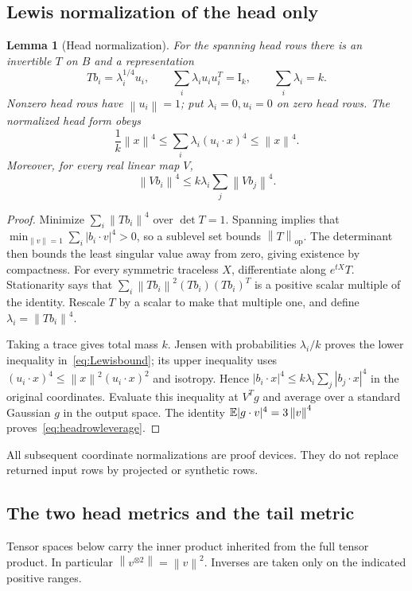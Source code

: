 \documentclass[11pt]{article}
\newtheorem{lemma}[theorem]{Lemma}
\theoremstyle{remark}\newtheorem{remark}[theorem]{Remark}
\newcommand{\op}{\mathrm{op}}\newcommand{\Frob}{\mathrm F}
\newcommand{\norm}[1]{\left\lVert#1\right\rVert}\newcommand{\abs}[1]{\left|#1\right|}
\newcommand{\Id}{\mathrm I}\newcommand{\dbar}{\bar d}
\numberwithin{equation}{section}
\begin{document}
\subsection{Lewis normalization of the head only}
\begin{lemma}[Head normalization]\label{lem:lewis}
For the spanning head rows there is an invertible $T$ on $B$ and a representation
\[
 Tb_i=\lambda_i^{1/4}u_i,\qquad
 \sum_i\lambda_i u_i u_i^T=\Id_k,\qquad
 \sum_i\lambda_i=k.
\]
Nonzero head rows have $\norm{u_i}=1$; put $\lambda_i=0,u_i=0$ on zero head rows. The normalized head form obeys
\begin{equation}\label{eq:Lewisbound}
 \frac1k\norm x^4\le \sum_i\lambda_i(u_i\cdot x)^4\le\norm x^4.
\end{equation}
Moreover, for every real linear map $V$,
\begin{equation}\label{eq:headrowleverage}
 \norm{Vb_i}^4\le k\lambda_i\sum_j\norm{Vb_j}^4.
\end{equation}
\end{lemma}
\begin{proof}
Minimize $\sum_i\norm{Tb_i}^4$ over $\det T=1$. Spanning implies that $\min_{\norm v=1}\sum_i|b_i\cdot v|^4>0$, so a sublevel set bounds $\norm T_\op$. The determinant then bounds the least singular value away from zero, giving existence by compactness. For every symmetric traceless $X$, differentiate along $e^{tX}T$. Stationarity says that $\sum_i\norm{Tb_i}^2(Tb_i)(Tb_i)^T$ is a positive scalar multiple of the identity. Rescale $T$ by a scalar to make that multiple one, and define $\lambda_i=\norm{Tb_i}^4$.

Taking a trace gives total mass $k$. Jensen with probabilities $\lambda_i/k$ proves the lower inequality in~\eqref{eq:Lewisbound}; its upper inequality uses $(u_i\cdot x)^4\le\norm x^2(u_i\cdot x)^2$ and isotropy. Hence $|b_i\cdot x|^4\le k\lambda_i\sum_j|b_j\cdot x|^4$ in the original coordinates. Evaluate this inequality at $V^Tg$ and average over a standard Gaussian $g$ in the output space. The identity $\E|g\cdot v|^4=3\norm v^4$ proves~\eqref{eq:headrowleverage}.
\end{proof}
All subsequent coordinate normalizations are proof devices. They do not replace returned input rows by projected or synthetic rows.

\subsection{The two head metrics and the tail metric}
Tensor spaces below carry the inner product inherited from the full tensor product. In particular $\norm{v^{\otimes2}}=\norm v^2$. Inverses are taken only on the indicated positive ranges.
\end{document}
